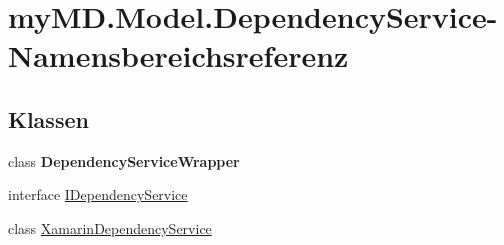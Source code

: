 \hypertarget{namespacemy_m_d_1_1_model_1_1_dependency_service}{}\section{my\+M\+D.\+Model.\+Dependency\+Service-\/\+Namensbereichsreferenz}
\label{namespacemy_m_d_1_1_model_1_1_dependency_service}
\subsection*{Klassen}
\begin{DoxyCompactItemize}
\item 
class {\bfseries Dependency\+Service\+Wrapper}
\item 
interface \mbox{\hyperlink{interfacemy_m_d_1_1_model_1_1_dependency_service_1_1_i_dependency_service}{I\+Dependency\+Service}}
\item 
class \mbox{\hyperlink{classmy_m_d_1_1_model_1_1_dependency_service_1_1_xamarin_dependency_service}{Xamarin\+Dependency\+Service}}
\end{DoxyCompactItemize}
